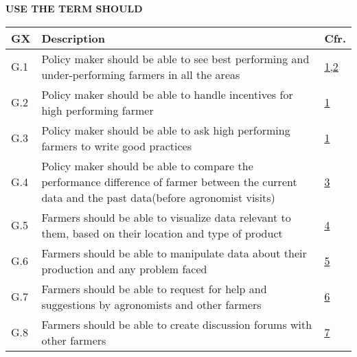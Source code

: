 \textbf{USE THE TERM SHOULD}
\begin{table}[H]
    \setlength\arrayrulewidth{1pt}
    \centering
    \begin{tabular}{|l|m{}|l|}
        \rowcolor{myblue}
        \hline
        \color{white}GX & \color{white}Description   & \color{white}Cfr.\\
        \hline
        G.1                                               &     Policy maker should be able to see best performing and under-performing farmers in all the areas &   \hyperref[line:policyMakersPrivileges]{1,2} \\
        \hline
        G.2                                                      &  Policy maker should be able to handle incentives for high performing farmer   &    \hyperref[line:policyMakersPrivileges]{1}\\
        \hline
        G.3                                     &   Policy maker should be able to ask high performing farmers to write good practices   &   \hyperref[line:policyMakersPrivileges]{1} \\
        \hline
        G.4                                              &   Policy maker should be able to compare the performance difference of farmer between the current data and the past data(before agronomist visits)     &   \hyperref[line:policyMakersPrivileges]{3} \\
        \hline
        G.5                                  &   Farmers should be able to visualize data relevant to them, based on their location and type of product   &   \hyperref[line:farmersPrivileges]{4} \\
        \hline
        G.6                                                      &  Farmers should be able to manipulate data about their production and any problem faced   &    \hyperref[line:farmersPrivileges]{5}\\%
        \hline
        G.7                                               &     Farmers should be able to request for help and suggestions by agronomists and other farmers &   \hyperref[line:farmersPrivileges]{6} \\
        \hline
        G.8                                              &   Farmers should be able to create discussion forums with other farmers     &   \hyperref[line:farmersPrivileges]{7} \\
        \hline

\end{tabular}
\end{table}
